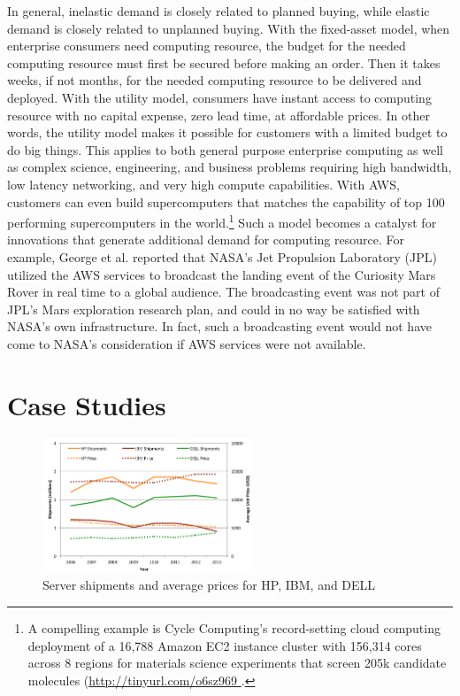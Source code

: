 \documentclass[10pt,journal,cspaper,compsoc]{IEEEtran}
\begin{document}
In general, inelastic demand is closely related to planned buying, while elastic demand is closely related to unplanned buying. With the fixed-asset model, when enterprise consumers need computing resource, the budget for the needed computing resource must first be secured before making an order. Then it takes weeks, if not months, for the needed computing resource to be delivered and deployed. With the utility model, consumers have instant access to computing resource with no capital expense, zero lead time, at affordable prices. In other words, the utility model makes it possible for customers with a limited budget to do big things. This applies to both general purpose enterprise computing as well as complex science, engineering, and business problems requiring high bandwidth, low latency networking, and very high compute capabilities. With AWS, customers can even build supercomputers that matches the capability of top 100 performing supercomputers in the world\cite{top500}.\footnote{A compelling example is Cycle Computing's record-setting cloud computing deployment of a 16,788 Amazon EC2 instance cluster with 156,314 cores across 8 regions for materials science experiments that screen 205k candidate molecules (\url{http://tinyurl.com/o6sz969 }.} Such a model becomes a catalyst for innovations that generate additional demand for computing resource. For example, George et al. \cite{jpl} reported that NASA's Jet Propulsion Laboratory (JPL) utilized the AWS services to broadcast the landing event of the Curiosity Mars Rover in real time to a global audience. The broadcasting event was not part of JPL's Mars exploration research plan, and could in no way be satisfied with NASA's own infrastructure. In fact, such a broadcasting event would not have come to NASA's consideration if AWS services were not available. 

\section{Case Studies}
\label{sec:casestudies}

\begin{figure}[t!]
\centering
\includegraphics[height=4.0cm]{fig08}
\caption{Server shipments and average prices for HP, IBM, and DELL}
\label{fig:shipmentsHPIBMDELL}
\end{figure}
\end{document}
